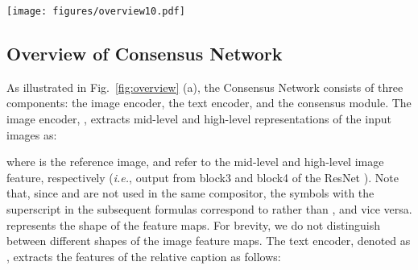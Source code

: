 \documentclass[sigconf]{acmart}
\def\ie{\emph{i.e.}}
\begin{document}
\begin{figure*}[ht]
    \centering
    \texttt{[image: figures/overview10.pdf]}
    \vspace{-.1in}
    \caption{The overview of the Consensus Network. Given a reference image and a relative caption, we first extract the mid-level image feature  and high-level image feature  with the image encoder , and the text representation  with the text encoder . Then, we fuse the text representation with either the mid-level or high-level image feature using compositors. The solid \textcolor{blue!80!black}{blue} lines represent mid-level image features, while dotted \textcolor{blue!80!black}{blue} lines indicate high-level image features and solid \textcolor{green!80!black}{green} lines denote text features. The text-image compositor  has the residual form of , which takes the word-level text representation  and the average pooled reference image feature  as input. The image-text compositor  has the residual form of  taking the intermediate feature map of the reference image  and the average pooled sentence-level text feature  as input. Each compositor generates its own composed feature. We use a simple attention-based multi-modal non-local block for the text-image compositor and employ CoSMo \cite{lee2021cosmo} for the image-text compositor. Finally, we match the composed features with the target image feature to train the model. The projector block consists of an averaging pooling layer (Avgpool) and a multilayer perceptron (MLP).}
    \label{fig:overview}
\end{figure*}

\subsection{Overview of Consensus Network}
\label{subsec:overview}
  
As illustrated in Fig.~\ref{fig:overview} (a), the Consensus Network consists of three components: the image encoder, the text encoder, and the consensus module. The image encoder, , extracts mid-level and high-level representations of the input images as:


where   is the reference image, and  refer to the mid-level and high-level image feature, respectively (\ie, output from block3 and block4 of the ResNet \cite{he2016deep}). Note that, since  and  are not used in the same compositor, the symbols with the superscript  in the subsequent formulas correspond to  rather than , and vice versa.  represents the shape of the feature maps. For brevity, we do not distinguish between different shapes of the image feature maps. 
The text encoder, denoted as , extracts the features of the relative caption as follows:
\end{document}
